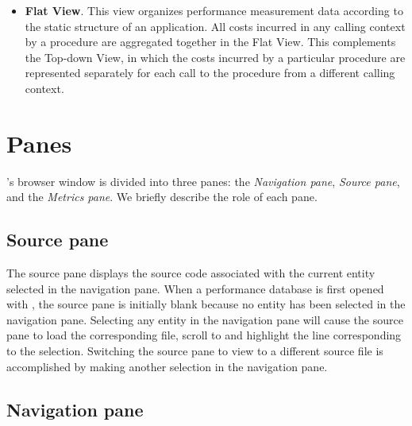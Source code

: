 \begin{itemize}
\item \textbf{Flat View}.
  This view organizes performance measurement data according to the static structure of an application.
  All costs incurred in any calling context by a procedure are aggregated together in the Flat View.
  This complements the Top-down View, in which the costs incurred by a particular procedure are represented separately for each call to the procedure from a different calling context.

\end{itemize}



\section{Panes}
\label{sec:hpcviewer:panes}

\hpcviewer{}'s browser window is divided into three panes: the \emph{Navigation pane}, \emph{Source pane}, and the \emph{Metrics pane}.
We briefly describe the role of each pane.


\subsection{Source pane}
\label{sec:pane-source}

The source pane displays the source code associated with the current entity selected in the navigation pane.
When a performance database is first opened with \hpcviewer{}, the source pane is initially blank because no entity has been selected in the navigation pane.
Selecting any entity in the navigation pane will cause the source pane to load the corresponding file, scroll to and highlight the line corresponding to the selection.
Switching the source pane to view to a different source file is accomplished by making another selection in the navigation pane.


\subsection{Navigation pane}

